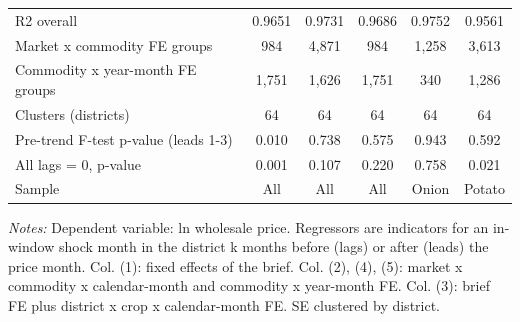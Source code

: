 \begin{table}[htbp]
\begin{tabular}{lccccc}
R2 overall & 0.9651 & 0.9731 & 0.9686 & 0.9752 & 0.9561 \\
Market x commodity FE groups & 984 & 4,871 & 984 & 1,258 & 3,613 \\
Commodity x year-month FE groups & 1,751 & 1,626 & 1,751 & 340 & 1,286 \\
Clusters (districts) & 64 & 64 & 64 & 64 & 64 \\
Pre-trend F-test p-value (leads 1-3) & 0.010 & 0.738 & 0.575 & 0.943 & 0.592 \\
All lags = 0, p-value & 0.001 & 0.107 & 0.220 & 0.758 & 0.021 \\
Sample & All & All & All & Onion & Potato \\
\bottomrule
\end{tabular}
\begin{minipage}{0.95\linewidth}\footnotesize \textit{Notes:} Dependent variable: ln wholesale price. Regressors are indicators for an in-window shock month in the district k months before (lags) or after (leads) the price month. Col. (1): fixed effects of the brief. Col. (2), (4), (5): market x commodity x calendar-month and commodity x year-month FE. Col. (3): brief FE plus district x crop x calendar-month FE. SE clustered by district.\end{minipage}
\end{table}